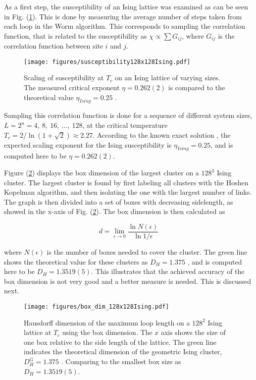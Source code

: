 As a first step, the susceptibility of an Ising lattice was examined as can be seen in Fig. (\ref{fig:results_isingsusc}). This is done by measuring the average number of steps taken from each loop in the Worm algorithm. This corresponds to sampling the correlation function, that is related to the susceptibility as $\chi \propto \sum G_{ij}$, where $G_{ij}$ is the correlation function between site $i$ and $j$.


\begin{figure}[h!]
    \centering
        \texttt{[image: figures/susceptibility128x128Ising.pdf]}
    \caption{Scaling of susceptibility at $T_c$ on an Ising lattice of varying sizes. The measured critical exponent $\eta = 0.262(2)$ is compared to the theoretical value $\eta_{Ising} = 0.25$ \cite{Plischke:EqStatMech}.}
    \label{fig:results_isingsusc}
\end{figure}


\noindent Sampling this correlation function is done for a sequence of different system sizes, $L = 2^n = 4, \ 8, \ 16, \ \ldots, \ 128$, at the critical temperature $T_c = 2 / \ln(1 + \sqrt{2}) \approx 2.27$. According to the known exact solution \cite{Plischke:EqStatMech}, the expected scaling exponent for the Ising susceptibility is $\eta_{Ising} = 0.25$, and is computed here to be $\eta = 0.262(2)$.

Figure (\ref{fig:results_boxdimension}) displays the box dimension of the largest cluster on a $128^3$ Ising cluster. The largest cluster is found by first labeling all clusters with the Hoshen Kopelman algorithm, and then isolating the one with the largest number of links. The graph is then divided into a set of boxes with decreasing sidelength, as showed in the x-axis of Fig. (\ref{fig:results_boxdimension}). The box dimension is then calculated as

\begin{equation}
    d = \lim_{\epsilon \to 0} \frac{\ln N(\epsilon)}{\ln 1 / \epsilon}
\end{equation}

\noindent where $N(\epsilon)$ is the number of boxes needed to cover the cluster. The green line shows the theoretical value for these clusters as $D_H = 1.375$ \cite{Duplantier:GeoHausdorff}, and is computed here to be $D_H = 1.3519(5)$. This illustrates that the achieved accuracy of the box dimension is not very good and a better measure is needed. This is discussed next.

\begin{figure}[h!]
    \centering
        \texttt{[image: figures/box\_dim\_128x128Ising.pdf]}
    \caption{Hausdorff dimension of the maximum loop length on a $128^2$ Ising lattice at $T_c$ using the box dimension. The $x$ axis shows the size of one box relative to the side length of the lattice. The green line indicates the theoretical dimension of the geometric Ising cluster, $D_H^G = 1.375$ \cite{Duplantier:GeoHausdorff}. Comparing to the smallest box size as $D_H = 1.3519(5)$.}
    \label{fig:results_boxdimension}
\end{figure}

